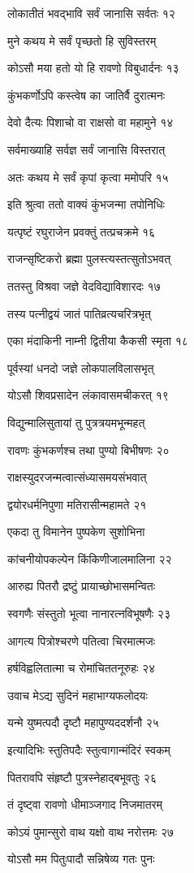 लोकातीतं भवद्भावि सर्वं जानासि सर्वतः १२

मुने कथय मे सर्वं पृच्छतो हि सुविस्तरम्

कोऽसौ मया हतो यो हि रावणो विबुधार्दनः १३

कुंभकर्णोऽपि कस्त्वेष का जातिर्वै दुरात्मनः

देवो दैत्यः पिशाचो वा राक्षसो वा महामुने १४

सर्वमाख्याहि सर्वज्ञ सर्वं जानासि विस्तरात्

अतः कथय मे सर्वं कृपां कृत्वा ममोपरि १५

इति श्रुत्वा ततो वाक्यं कुंभजन्मा तपोनिधिः

यत्पृष्टं रघुराजेन प्रवक्तुं तत्प्रचक्रमे १६

राजन्सृष्टिकरो ब्रह्मा पुलस्त्यस्तत्सुतोऽभवत्

ततस्तु विश्रवा जज्ञे वेदविद्याविशारदः १७

तस्य पत्नीद्वयं जातं पातिव्रत्यचरित्रभृत्

एका मंदाकिनी नाम्नी द्वितीया कैकसी स्मृता १८

पूर्वस्यां धनदो जज्ञे लोकपालविलासभृत्

योऽसौ शिवप्रसादेन लंकावासमचीकरत् १९

विद्युन्मालिसुतायां तु पुत्रत्रयमभून्महत्

रावणः कुंभकर्णश्च तथा पुण्यो बिभीषणः २०

राक्षस्युदरजन्मत्वात्संध्यासमयसंभवात्

द्वयोरधर्मनिपुणा मतिरासीन्महामते २१

एकदा तु विमानेन पुष्पकेण सुशोभिना

कांचनीयोपकल्पेन किंकिणीजालमालिना २२

आरुह्य पितरौ द्रष्टुं प्रायाच्छोभासमन्वितः

स्वगणैः संस्तुतो भूत्वा नानारत्नविभूषणैः २३

आगत्य पित्रोश्चरणे पतित्वा चिरमात्मजः

हर्षविह्वलितात्मा च रोमांचिततनूरुहः २४

उवाच मेऽद्य सुदिनं महाभाग्यफलोदयः

यन्मे युष्मत्पदौ दृष्टौ महापुण्यददर्शनौ २५

इत्यादिभिः स्तुतिपदैः स्तुत्वागान्मंदिरं स्वकम्

पितरावपि संहृष्टौ पुत्रस्नेहाद्बभूवतुः २६

तं दृष्ट्वा रावणो धीमाञ्जगाद निजमातरम्

कोऽयं पुमान्सुरो वाथ यक्षो वाथ नरोत्तमः २७

योऽसौ मम पितुःपादौ सन्निषेव्य गतः पुनः


